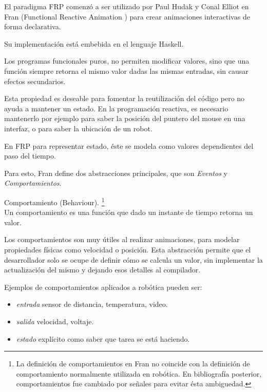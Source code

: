 

El paradigma FRP comenzó a ser utilizado por Paul Hudak y Conal Elliot en
Fran (Functional Reactive Animation \cite{ElliottHudak97:Fran})
para crear animaciones interactivas de forma declarativa.

Su implementación está embebida en el lenguaje Haskell.

Los programas funcionales puros, no permiten modificar valores,
sino que una función siempre retorna el mismo valor dadas las mismas
entradas, sin causar efectos secundarios.

Esta propiedad es deseable para fomentar la reutilización del código
pero no ayuda a mantener un estado.
En la programación reactiva, es necesario mantenerlo por
ejemplo para saber la posición del puntero del mouse en una interfaz,
o para saber la ubicación de un robot.

En FRP para representar estado, éste se modela como valores dependientes
del paso del tiempo.

Para esto, Fran define dos abstracciones principales,
que son \emph{Eventos} y \emph{Comportamientos}.

\begin{definicion}
  Comportamiento (Behaviour). \cite{petersonhudakelliot99:lambdainmotion} 
      \footnote{La definición de comportamientos en Fran no coincide con
      la definición de comportamiento normalmente utilizada en robótica.
      En bibliografía posterior, comportamientos fue cambiado por señales
      para evitar ésta ambiguedad.}\\

  Un comportamiento es una función que dado un instante de tiempo
  retorna un valor.


\end{definicion}

  Los comportamientos son muy útiles al realizar animaciones,
para modelar propiedades físicas como velocidad o posición.
  Esta abstracción permite que el desarrollador solo se ocupe de
definir cómo se calcula un valor, sin implementar la actualización
del mismo y dejando esos detalles al compilador.

  Ejemplos de comportamientos aplicados a robótica pueden ser:

\begin{itemize}
  \item \textit{entrada} sensor de distancia, temperatura, video.
  \item \textit{salida} velocidad, voltaje.
  \item \textit{estado} explícito como saber que tarea se está haciendo.
\end{itemize}


